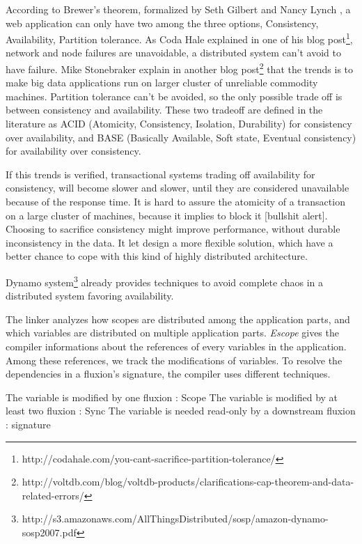 According to Brewer's theorem, formalized by Seth Gilbert and Nancy Lynch \cite{Gilbert2002}, a web application can only have two among the three options, Consistency, Availability, Partition tolerance.
As Coda Hale explained in one of his blog post\footnote{http://codahale.com/you-cant-sacrifice-partition-tolerance/}, network and node failures are unavoidable, a distributed system can't avoid to have failure.
Mike Stonebraker explain in another blog post\footnote{http://voltdb.com/blog/voltdb-products/clarifications-cap-theorem-and-data-related-errors/} that the trends is to make big data applications run on larger cluster of unreliable commodity machines.
Partition tolerance can't be avoided, so the only possible trade off is between consistency and availability.
These two tradeoff are defined in the literature as ACID (Atomicity, Consistency, Isolation, Durability) for consistency over availability, and BASE (Basically Available, Soft state, Eventual consistency) for availability over consistency.

If this trends is verified, transactional systems trading off availability for consistency, will become slower and slower, until they are considered unavailable because of the response time.
It is hard to assure the atomicity of a transaction on a large cluster of machines, because it implies to block it [bullshit alert].
Choosing to sacrifice consistency might improve performance, without durable inconsistency in the data.
It let design a more flexible solution, which have a better chance to cope with this kind of highly distributed architecture.

Dynamo system\footnote{http://s3.amazonaws.com/AllThingsDistributed/sosp/amazon-dynamo-sosp2007.pdf} already provides techniques to avoid complete chaos in a distributed system favoring availability.


The linker analyzes how scopes are distributed among the application parts, and which variables are distributed on multiple application parts.
\textit{Escope} gives the compiler informations about the references of every variables in the application.
Among these references, we track the modifications of variables.
To resolve the dependencies in a fluxion's signature, the compiler uses different techniques.

The variable is modified by one fluxion : Scope
The variable is modified by at least two fluxion : Sync
The variable is needed read-only by a downstream fluxion : signature

